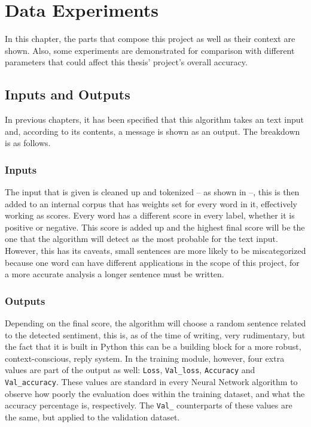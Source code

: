 \chapter{Data Experiments}
\label{ch5}
In this chapter, the parts that compose this project as well as their context are shown. Also, some experiments are demonstrated for comparison with different parameters that could affect this thesis' project's overall accuracy.

\section{Inputs and Outputs}
In previous chapters, it has been specified that this algorithm takes an text input and, according to its contents, a message is shown as an output. The breakdown is as follows.
\subsection{Inputs}
The input that is given is cleaned up and tokenized -- as shown in  --, this is then added to an internal corpus that has weights set for every word in it, effectively working as scores. Every word has a different score in every label, whether it is positive or negative. This score is added up and the highest final score will be the one that the algorithm will detect as the most probable for the text input. However, this has its caveats, small sentences are more likely to be miscategorized because one word can have different applications in the scope of this project, for a more accurate analysis a longer sentence must be written.
\subsection{Outputs}
Depending on the final score, the algorithm will choose a random sentence related to the detected sentiment, this is, as of the time of writing, very rudimentary, but the fact that it is built in Python this can be a building block for a more robust, context-conscious, reply system.
In the training module, however, four extra values are part of the output as well: \texttt{Loss}, \texttt{Val\_loss}, \texttt{Accuracy} and \texttt{Val\_accuracy}.
These values are standard in every Neural Network algorithm to observe how poorly the evaluation does within the training dataset, and what the accuracy percentage is, respectively.
The \texttt{Val\_} counterparts of these values are the same, but applied to the validation dataset.

